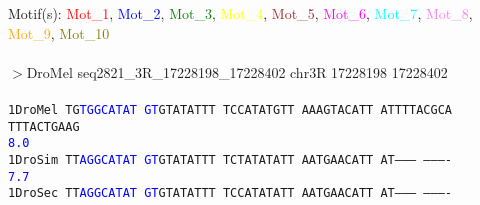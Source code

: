 \documentclass[11pt,twoside,reqno,a4paper]{article}
\begin{document}
\noindent
\newlength{\charwidth}Motif(s): \textcolor{red}{Mot\_1}, \textcolor{blue}{Mot\_2}, \textcolor{green}{Mot\_3}, \textcolor{yellow}{Mot\_4}, \textcolor{brown}{Mot\_5}, \textcolor{magenta}{Mot\_6}, \textcolor{cyan}{Mot\_7}, \textcolor{violet}{Mot\_8}, \textcolor{orange}{Mot\_9}, \textcolor{olive}{Mot\_10}\\
\\
$>$DroMel	seq2821\_3R\_17228198\_17228402	chr3R	17228198	17228402 \\
 \\
\texttt{1\hspace*{3\charwidth}DroMel	TG\textcolor{blue}{T}\textcolor{blue}{G}\textcolor{blue}{G}\textcolor{blue}{C}\textcolor{blue}{A}\textcolor{blue}{T}\textcolor{blue}{A}\textcolor{blue}{T}	\textcolor{blue}{G}\textcolor{blue}{T}GTATATTT	TCCATATGTT	AAAGTACATT	ATTTTACGCA	TTTACTGAAG	\\
\hspace*{4\charwidth}\hspace*{7\charwidth}\hspace*{2\charwidth}\textcolor{blue}{8.0}\hspace*{1\charwidth}\hspace*{1\charwidth}\hspace*{1\charwidth}\hspace*{1\charwidth}\hspace*{1\charwidth}\hspace*{1\charwidth}\\
1\hspace*{3\charwidth}DroSim	TT\textcolor{blue}{A}\textcolor{blue}{G}\textcolor{blue}{G}\textcolor{blue}{C}\textcolor{blue}{A}\textcolor{blue}{T}\textcolor{blue}{A}\textcolor{blue}{T}	\textcolor{blue}{G}\textcolor{blue}{T}GTATATTT	TCTATATATT	AATGAACATT	AT--------	----------	\\
\hspace*{4\charwidth}\hspace*{7\charwidth}\hspace*{2\charwidth}\textcolor{blue}{7.7}\hspace*{1\charwidth}\hspace*{1\charwidth}\hspace*{1\charwidth}\hspace*{1\charwidth}\hspace*{1\charwidth}\hspace*{1\charwidth}\\
1\hspace*{3\charwidth}DroSec	TT\textcolor{blue}{A}\textcolor{blue}{G}\textcolor{blue}{G}\textcolor{blue}{C}\textcolor{blue}{A}\textcolor{blue}{T}\textcolor{blue}{A}\textcolor{blue}{T}	\textcolor{blue}{G}\textcolor{blue}{T}GTATATTT	TCCATATATT	AATGAACATT	AT--------	----------	\\
}
\end{document}
